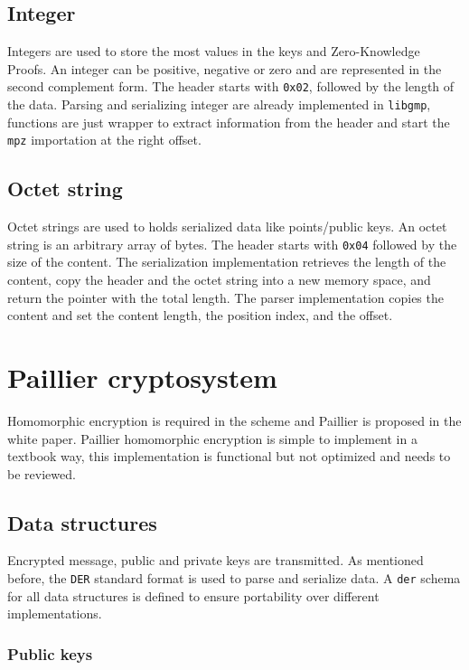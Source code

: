 \subsection{Integer}

Integers are used to store the most values in the keys and Zero-Knowledge
Proofs. An integer can be positive, negative or zero and are represented in the
second complement form. The header starts with \texttt{0x02}, followed by the
length of the data. Parsing and serializing integer are already implemented in
\texttt{libgmp}, functions are just wrapper to extract information from the
header and start the \texttt{mpz} importation at the right offset.

\subsection{Octet string}

Octet strings are used to holds serialized data like points/public keys. An
octet string is an arbitrary array of bytes. The header starts with
\texttt{0x04} followed by the size of the content. The serialization
implementation retrieves the length of the content, copy the header and the
octet string into a new memory space, and return the pointer with the total
length. The parser implementation copies the content and set the content length,
the position index, and the offset.

\section{Paillier cryptosystem}

Homomorphic encryption is required in the scheme and Paillier is proposed in the
white paper. Paillier homomorphic encryption is simple to implement in a
textbook way, this implementation is functional but not optimized and needs to
be reviewed.

\subsection{Data structures}

Encrypted message, public and private keys are transmitted. As mentioned before,
the \texttt{DER} standard format is used to parse and serialize data. A
\texttt{der} schema for all data structures is defined to ensure portability
over different implementations.

\subsubsection{Public keys}

